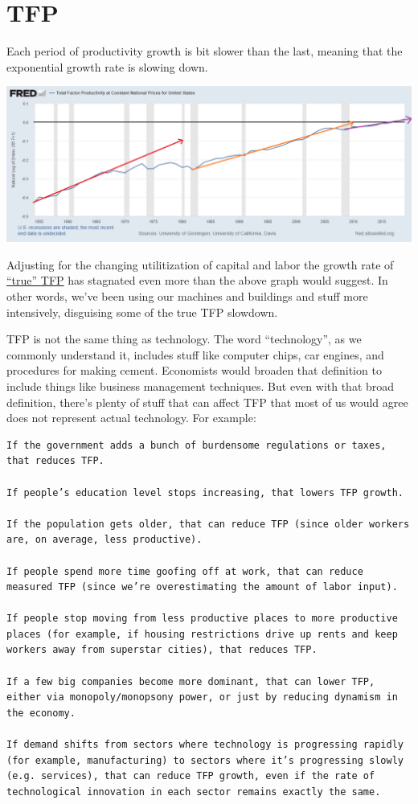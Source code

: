 \documentclass[
]{book}
\begin{document}
\hypertarget{tfp}{%
\section{TFP}\label{tfp}}

Each period of productivity growth is bit slower than the last,
meaning that the exponential growth rate is slowing down.

\includegraphics{fig/TFP_US_Log.png}

Adjusting for the changing utilitization of capital and labor the growth rate
of \href{https://growthecon.com/blog/BLS-TFP/}{``true'' TFP} has stagnated even more than the above graph would suggest.
In other words, we've been using our machines and buildings and stuff more intensively,
disguising some of the true TFP slowdown.

TFP is not the same thing as technology. The word ``technology'', as we commonly understand it, includes stuff like computer chips, car engines, and procedures for making cement. Economists would broaden that definition to include things like business management techniques. But even with that broad definition, there's plenty of stuff that can affect TFP that most of us would agree does not represent actual technology. For example:

\begin{verbatim}
If the government adds a bunch of burdensome regulations or taxes, that reduces TFP.

If people’s education level stops increasing, that lowers TFP growth.

If the population gets older, that can reduce TFP (since older workers are, on average, less productive).

If people spend more time goofing off at work, that can reduce measured TFP (since we’re overestimating the amount of labor input).

If people stop moving from less productive places to more productive places (for example, if housing restrictions drive up rents and keep workers away from superstar cities), that reduces TFP.

If a few big companies become more dominant, that can lower TFP, either via monopoly/monopsony power, or just by reducing dynamism in the economy.

If demand shifts from sectors where technology is progressing rapidly (for example, manufacturing) to sectors where it’s progressing slowly (e.g. services), that can reduce TFP growth, even if the rate of technological innovation in each sector remains exactly the same.
\end{verbatim}
\end{document}
